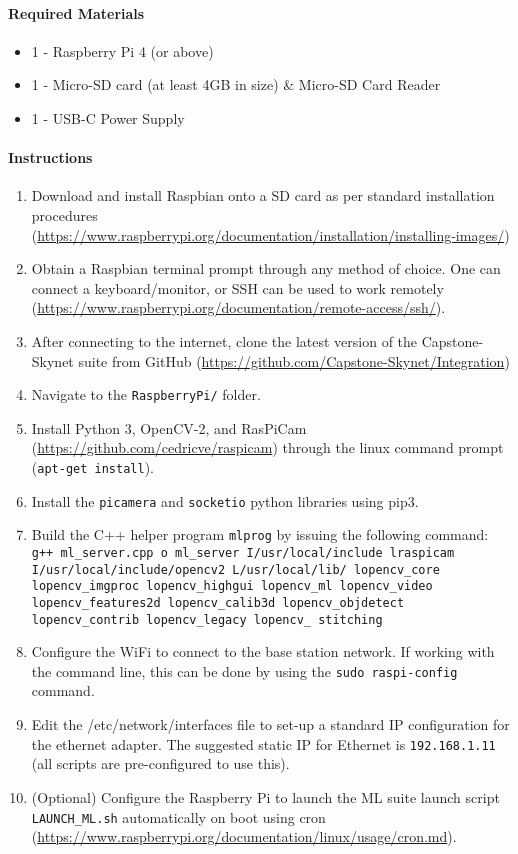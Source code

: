 \documentclass[10pt,letterpaper]{article}
\begin{document}
\paragraph{Required Materials}
\begin{itemize}
\item 1 - Raspberry Pi 4 (or above)
\item 1 - Micro-SD card (at least 4GB in size) \& Micro-SD Card Reader
\item 1 - USB-C Power Supply
\end{itemize}

\paragraph{Instructions}
\begin{enumerate}
\item Download and install Raspbian onto a SD card as per standard installation procedures (\url{https://www.raspberrypi.org/documentation/installation/installing-images/})
\item Obtain a Raspbian terminal prompt through any method of choice. One can connect a keyboard/monitor, or SSH can be used to work remotely (\url{https://www.raspberrypi.org/documentation/remote-access/ssh/}).
\item After connecting to the internet, clone the latest version of the Capstone-Skynet suite from GitHub (\url{https://github.com/Capstone-Skynet/Integration})
\item Navigate to the \texttt{RaspberryPi/} folder.
\item Install Python 3, OpenCV-2, and RasPiCam (\url{https://github.com/cedricve/raspicam}) through the linux command prompt (\texttt{apt-get install}). 
\item Install the \texttt{picamera} and \texttt{socketio} python libraries using pip3.
\item Build the C++ helper program \texttt{mlprog} by issuing the following command: \texttt{g++ ml\_server.cpp \-o ml\_server \-I/usr/local/include \-lraspicam \-I/usr/local/include/opencv2 \-L/usr/local/lib/ \-lopencv\_core \-lopencv\_imgproc \-lopencv\_highgui \-lopencv\_ml \-lopencv\_video \-lopencv\_features2d \-lopencv\_calib3d \-lopencv\_objdetect \-lopencv\_contrib \-lopencv\_legacy \-lopencv\_ stitching}
\item Configure the WiFi to connect to the base station network. If working with the command line, this can be done by using the \texttt{sudo raspi-config} command.
\item Edit the /etc/network/interfaces file to set-up a standard IP configuration for the ethernet adapter. The suggested static IP for Ethernet is \texttt{192.168.1.11}  (all scripts are pre-configured to use this).
\item (Optional) Configure the Raspberry Pi to launch the ML suite launch script \texttt{LAUNCH\_ML.sh} automatically on boot using cron (\url{https://www.raspberrypi.org/documentation/linux/usage/cron.md}).
\end{enumerate}
\end{document}
